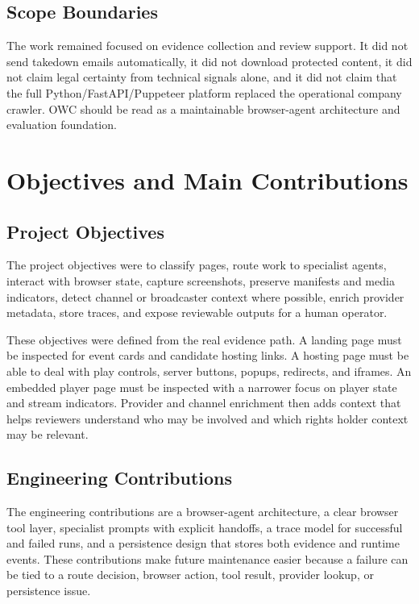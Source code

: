 \subsection{Scope Boundaries}

The work remained focused on evidence collection and review support. It did not
send takedown emails automatically, it did not download protected content, it
did not claim legal certainty from technical signals alone, and it did not
claim that the full Python/FastAPI/Puppeteer platform replaced the operational
company crawler. OWC should be read as a maintainable browser-agent
architecture and evaluation foundation.

\section{Objectives and Main Contributions}

\subsection{Project Objectives}

The project objectives were to classify pages, route work to specialist agents,
interact with browser state, capture screenshots, preserve manifests and media
indicators, detect channel or broadcaster context where possible, enrich
provider metadata, store traces, and expose reviewable outputs for a human
operator.

These objectives were defined from the real evidence path. A landing page must
be inspected for event cards and candidate hosting links. A hosting page must
be able to deal with play controls, server buttons, popups, redirects, and
iframes. An embedded player page must be inspected with a narrower focus on
player state and stream indicators. Provider and channel enrichment then adds
context that helps reviewers understand who may be involved and which rights
holder context may be relevant.

\subsection{Engineering Contributions}

The engineering contributions are a browser-agent architecture, a clear browser
tool layer, specialist prompts with explicit handoffs, a trace model for
successful and failed runs, and a persistence design that stores both evidence
and runtime events. These contributions make future maintenance easier because
a failure can be tied to a route decision, browser action, tool result,
provider lookup, or persistence issue.

